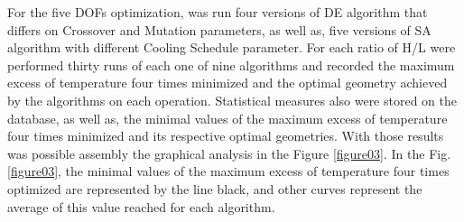 \documentclass[10pt,fleqn,a4paper,twoside]{article}
\begin{document}
For the five DOFs optimization, was run four versions of DE algorithm that differs on Crossover and Mutation parameters, as well as, five versions of SA algorithm with different Cooling Schedule parameter. For each ratio of H/L were performed thirty runs of each one of nine algorithms and recorded the maximum excess of temperature four times minimized and the optimal geometry achieved by the algorithms on each operation. Statistical measures also were stored on the database, as well as, the minimal values of the maximum excess of temperature four times minimized and its respective optimal geometries. With those results was possible assembly the graphical analysis in the Figure \ref{figure03}. In the Fig. \ref{figure03}, the minimal values of the maximum excess of temperature four times optimized are represented by the line black, and other curves represent the average of this value reached for each algorithm. 

\end{document}
